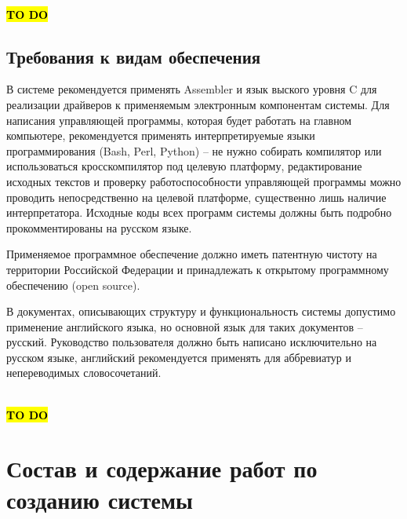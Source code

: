 \documentclass[a4paper, 12pt, titlepage]{article}
\begin{document}

\\
\hl{\bf TO DO}
\subsection{Требования к видам обеспечения}

В системе рекомендуется применять Assembler и язык выского уровня C для реализации драйверов к применяемым 
электронным компонентам системы. Для написания управляющей программы, которая будет работать на главном 
компьютере, рекомендуется применять интерпретируемые языки программирования (Bash, Perl, Python) -- не нужно собирать компилятор 
или использоваться кросскомпилятор под целевую платформу, редактирование исходных текстов и проверку работоспособности 
управляющей программы можно проводить непосредственно на целевой платформе, существенно лишь наличие интерпретатора. Исходные 
коды всех программ системы должны быть подробно прокомментированы на русском языке.

Применяемое программное обеспечение должно иметь патентную чистоту на территории Российской Федерации и принадлежать к 
открытому программному обеспечению (open source).

В документах, описывающих структуру и функциональность системы допустимо применение английского языка, но основной язык для 
таких документов -- русский. Руководство пользователя должно быть написано исключительно на русском языке, английский рекомендуется 
применять для аббревиатур и непереводимых словосочетаний.


\\
\hl{\bf TO DO}
\section{Состав и содержание работ по созданию системы}
\end{document}
